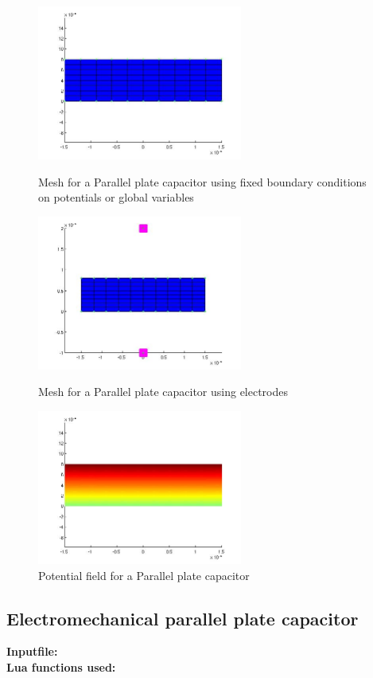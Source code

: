 \begin{figure}[htbp]
\centering
\includegraphics[height = 2in]{fig/e_pp_capacitor_mesh_fix.jpg}
\caption{Mesh for a Parallel plate capacitor using fixed boundary conditions
         on potentials or global variables}
\label{fig:ElectrostaticParallelPlateCapacitorFixMesh}
\includegraphics[height = 2in]{fig/e_pp_capacitor_mesh_electrodes.jpg}
\caption{Mesh for a Parallel plate capacitor using electrodes}
\label{fig:ElectrostaticParallelPlateCapacitorElectrodesMesh}
\includegraphics[height = 2in]{fig/e_pp_capacitor_field.jpg}
\caption{Potential field for a Parallel plate capacitor}
\label{fig:ElectrostaticParallelPlateCapacitorPotentialField}
\end{figure}

\clearpage
\subsection{Electromechanical parallel plate capacitor}
\begin{flushleft}
  \textbf{Inputfile:}
  \\
  \textbf{Lua functions used:}
\end{flushleft}

